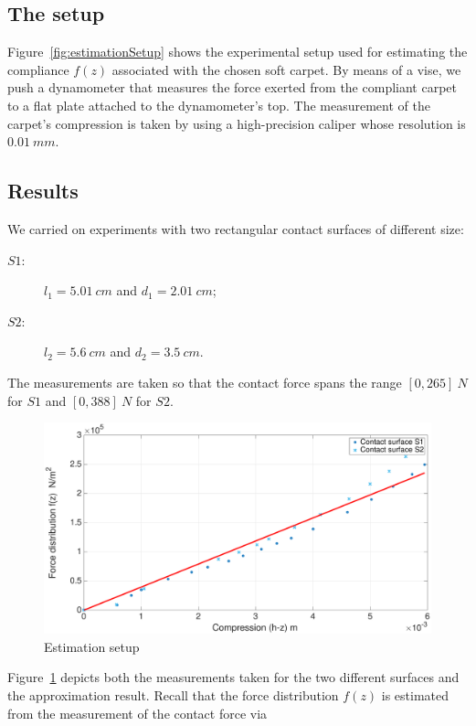 \documentclass[12pt,a4paper,twoside]{article}
\begin{document}
\subsection{The setup}
Figure~\ref{fig:estimationSetup} shows the experimental setup used for estimating the compliance $f(z)$ associated with the chosen soft carpet. 
By means of a vise, we push a dynamometer that measures the force exerted from the compliant carpet to a flat plate attached to the  dynamometer's top.
The measurement of the carpet's compression is taken by using a high-precision caliper whose resolution is $0.01 \ mm$.

\subsection{Results}
We carried on experiments with two rectangular contact surfaces of different size:
\begin{description}
  \item[$S1:$] $l_1 = 5.01 \ cm$ and $d_1 = 2.01 \ cm$;
  \item[$S2:$] $l_2 = 5.6 \ cm$ and $d_2 = 3.5 \ cm$.
\end{description}
The measurements are taken so that the contact force spans the range $[0,265] \ N$ for $S1$ and $[0,388] \ N$ for $S2$.
\begin{figure}[t]
    \begin{center}
\includegraphics[width=\linewidth]{images/estimationTests.eps}    \caption{Estimation setup}
    \label{fig:estimationResults}
    \end{center}
\end{figure}
Figure~\ref{fig:estimationResults} depicts both the measurements taken  for the two different surfaces and the approximation result. Recall that the force distribution $f(z)$ is estimated from the measurement of the contact force via  
\end{document}
